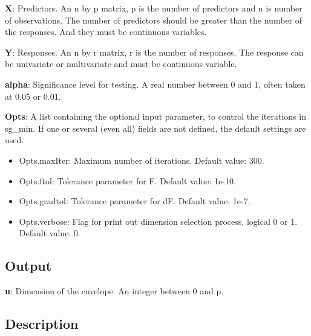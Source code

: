 \documentclass[a4paper,11pt,openany]{memoir}
\begin{document}
\begin{par}
\textbf{X}: Predictors. An n by p matrix, p is the number of predictors and n is number of observations. The number of predictors should be greater than the number of the responses. And they must be continuous variables.
\end{par} \vspace{1em}
\begin{par}
\textbf{Y}: Responses. An n by r matrix, r is the number of responses. The response can be univariate or multivariate and must be continuous variable.
\end{par} \vspace{1em}
\begin{par}
\textbf{alpha}: Significance level for testing.  A real number between 0 and 1, often taken at 0.05 or 0.01.
\end{par} \vspace{1em}
\begin{par}
\textbf{Opts}: A list containing the optional input parameter, to control the iterations in sg\_min. If one or several (even all) fields are not defined, the default settings are used.
\end{par} \vspace{1em}
\begin{itemize}
\setlength{\itemsep}{-1ex}
   \item Opts.maxIter: Maximum number of iterations.  Default value: 300.
   \item Opts.ftol: Tolerance parameter for F.  Default value: 1e-10.
   \item Opts.gradtol: Tolerance parameter for dF.  Default value: 1e-7.
   \item Opts.verbose: Flag for print out dimension selection process, logical 0 or 1. Default value: 0.
\end{itemize}


\subsection*{Output}

\begin{par}
\textbf{u}: Dimension of the envelope. An integer between 0 and p.
\end{par} \vspace{1em}


\subsection*{Description}
\end{document}
